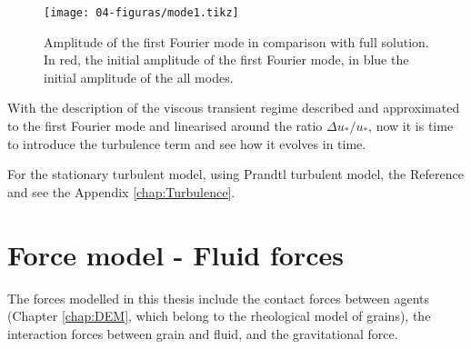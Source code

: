     \begin{figure}[H]
        \centering
        \texttt{[image: 04-figuras/mode1.tikz]}
        \caption[1$^{st}$ Fourier mode for viscous fluid velocity.]{Amplitude of the first Fourier mode in comparison with full solution. In red, the initial amplitude of the first Fourier mode, in blue the initial amplitude of the all modes.}
        \label{fig:mode1}
    \end{figure}

    With the description of the viscous transient regime described and approximated to the first Fourier mode and linearised around the ratio $\Delta u_*/u_*$, now it is time to introduce the turbulence term and see how it evolves in time.

    For the stationary turbulent model, using Prandtl turbulent model, the Reference \cite{Numerical_simulation_of_turbulent_sediment_transport} and see the Appendix \ref{chap:Turbulence}.

\section{Force model - Fluid forces}
\label{subchap:Modelo_Forcas}
    The forces modelled in this thesis include the contact forces between agents (Chapter \ref{chap:DEM}, which belong to the rheological model of grains), the interaction forces between grain and fluid, and the gravitational force. 

